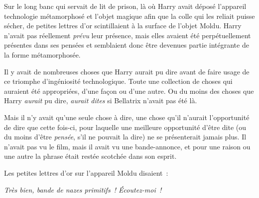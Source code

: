 Sur le long banc qui servait de lit de prison, là où Harry avait déposé l'appareil technologie métamorphosé et l'objet magique afin que la colle qui les reliait puisse sécher, de petites lettres d'or scintillaient à la surface de l'objet Moldu.
Harry n'avait pas réellement \emph{prévu} leur présence, mais elles avaient été perpétuellement présentes dans ses pensées et semblaient donc être devenues partie intégrante de la forme métamorphosée.

Il y avait de nombreuses choses que Harry aurait pu dire avant de faire usage de ce triomphe d'ingéniosité technologique.
Toute une collection de choses qui auraient été appropriées, d'une façon ou d'une autre.
Ou du moins des choses que Harry \emph{aurait} pu dire, \emph{aurait dites} si Bellatrix n'avait pas été là.

Mais il n'y avait qu'une seule chose à dire, une chose qu'il n'aurait l'opportunité de dire que cette fois-ci, pour laquelle une meilleure opportunité d'être dite (ou du moins d'être \emph{pensée}, s'il ne pouvait la dire) ne se présenterait jamais plus.
Il n'avait pas vu le film, mais il avait vu une bande-annonce, et pour une raison ou une autre la phrase était restée scotchée dans son esprit.

Les petites lettres d'or sur l'appareil Moldu disaient~:

\emph{Très bien, bande de nazes primitifs~!
Écoutez-moi~!}

